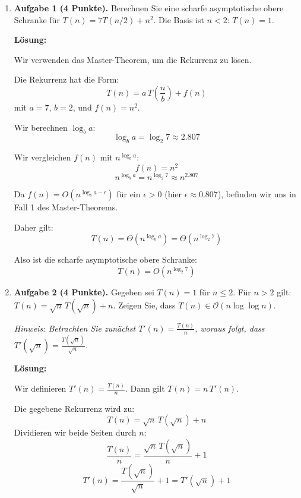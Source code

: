 \documentclass[11pt]{article}
\begin{document}
\begin{enumerate}

	\item \textbf{Aufgabe 1 (4 Punkte).} Berechnen Sie eine scharfe asymptotische obere Schranke für \(T(n) = 7 T(n / 2) + n^{2}\). Die Basis ist \(n < 2\): \(T(n) = 1\).

	      \textbf{Lösung:}

	      Wir verwenden das Master-Theorem, um die Rekurrenz zu lösen.

	      Die Rekurrenz hat die Form:
	      \[ T(n) = a\, T\left( \frac{n}{b} \right) + f(n) \]
	      mit
	      \( a = 7 \), \( b = 2 \), und \( f(n) = n^{2} \).

	      Wir berechnen \(\log_b a\):
	      \[ \log_b a = \log_2 7 \approx 2.807 \]

	      Wir vergleichen \(f(n)\) mit \(n^{\log_b a}\):
	      \[ f(n) = n^{2} \]
	      \[ n^{\log_b a} = n^{\log_2 7} \approx n^{2.807} \]

	      Da \( f(n) = O\left( n^{\log_b a - \epsilon} \right) \) für ein \( \epsilon > 0 \) (hier \( \epsilon \approx 0.807 \)), befinden wir uns in Fall 1 des Master-Theorems.

	      Daher gilt:
	      \[ T(n) = \Theta\left( n^{\log_b a} \right) = \Theta\left( n^{\log_2 7} \right) \]

	      Also ist die scharfe asymptotische obere Schranke:
	      \[ T(n) = O\left( n^{\log_2 7} \right) \]

	\item \textbf{Aufgabe 2 (4 Punkte).} Gegeben sei \(T(n) = 1\) für \(n \leq 2\). Für \(n > 2\) gilt: \(T(n) = \sqrt{n}\, T(\sqrt{n}) + n\). Zeigen Sie, dass \(T(n) \in \mathcal{O}(n \log \log n)\).

	      \textit{Hinweis: Betrachten Sie zunächst \(T'(n) = \frac{T(n)}{n}\), woraus folgt, dass \(T'(\sqrt{n}) = \frac{T(\sqrt{n})}{\sqrt{n}}\).}

	      \textbf{Lösung:}

	      Wir definieren \( T'(n) = \frac{T(n)}{n} \). Dann gilt \( T(n) = n\, T'(n) \).

	      Die gegebene Rekurrenz wird zu:
	      \[
		      T(n) = \sqrt{n}\, T(\sqrt{n}) + n
	      \]
	      Dividieren wir beide Seiten durch \( n \):
	      \[
		      \frac{T(n)}{n} = \frac{\sqrt{n}\, T(\sqrt{n})}{n} + 1
	      \]
	      \[
		      T'(n) = \frac{T(\sqrt{n})}{\sqrt{n}} + 1 = T'(\sqrt{n}) + 1
	      \]


\end{enumerate}
\end{document}
